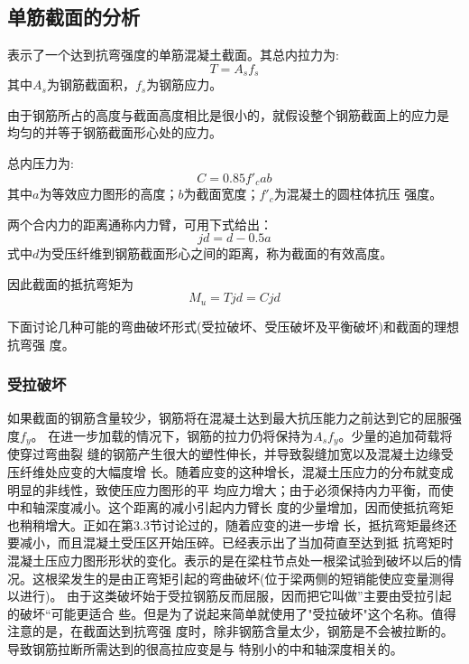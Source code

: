 \documentclass[12pt,a4paper]{book}
\begin{document}
\subsection{单筋截面的分析}

表示了一个达到抗弯强度的单筋混凝土截面。其总内拉力为:
\begin{equation}
  \label{eq:11}
  T=A_sf_s
\end{equation}
其中$A_s$为钢筋截面积，$f_s$为钢筋应力。

由于钢筋所占的高度与截面高度相比是很小的，就假设整个钢筋截面上的应力是
均匀的并等于钢筋截面形心处的应力。

总内压力为:
\begin{equation}
  \label{eq:12}
  C=0.85f'_cab
\end{equation}
其中$a$为等效应力图形的高度；$b$为截面宽度；$f'_c$为混凝土的圆柱体抗压
强度。

两个合内力的距离通称内力臂，可用下式给出：
\begin{equation}
  \label{eq:13}
  jd=d-0.5a
\end{equation}
式中$d$为受压纤维到钢筋截面形心之间的距离，称为截面的有效高度。

因此截面的抵抗弯矩为
\begin{equation}
  \label{eq:14}
  M_u=Tjd=Cjd
\end{equation}

下面讨论几种可能的弯曲破坏形式(受拉破坏、受压破坏及平衡破坏)和截面的理想抗弯强
度。

\subsubsection{受拉破坏}

如果截面的钢筋含量较少，钢筋将在混凝土达到最大抗压能力之前达到它的屈服强度$f_y$。
在进一步加载的情况下，钢筋的拉力仍将保持为$A_sf_y$。少量的追加荷载将使穿过弯曲裂
缝的钢筋产生很大的塑性伸长，并导致裂缝加宽以及混凝土边缘受压纤维处应变的大幅度增
长。随着应变的这种增长，混凝土压应力的分布就变成明显的非线性，致使压应力图形的平
均应力增大；由于必须保持内力平衡，而使中和轴深度减小。这个距离的减小引起内力臂长
度的少量增加，因而使抵抗弯矩也稍稍增大。正如在第3.3节讨论过的，随着应变的进一步增
长，抵抗弯矩最终还要减小，而且混凝土受压区开始压碎。已经表示出了当加荷直至达到抵
抗弯矩时混凝土压应力图形形状的变化。表示的是在梁柱节点处一根梁试验到破坏以后的情
况。这根梁发生的是由正弯矩引起的弯曲破坏(位于梁两侧的短销能使应变量测得以进行)。
由于这类破坏始于受拉钢筋反而屈服，因而把它叫做”主要由受拉引起的破坏“可能更适合
些。但是为了说起来简单就使用了"受拉破坏"这个名称。值得注意的是，在截面达到抗弯强
度时，除非钢筋含量太少，钢筋是不会被拉断的。导致钢筋拉断所需达到的很高拉应变是与
特别小的中和轴深度相关的。
\end{document}
